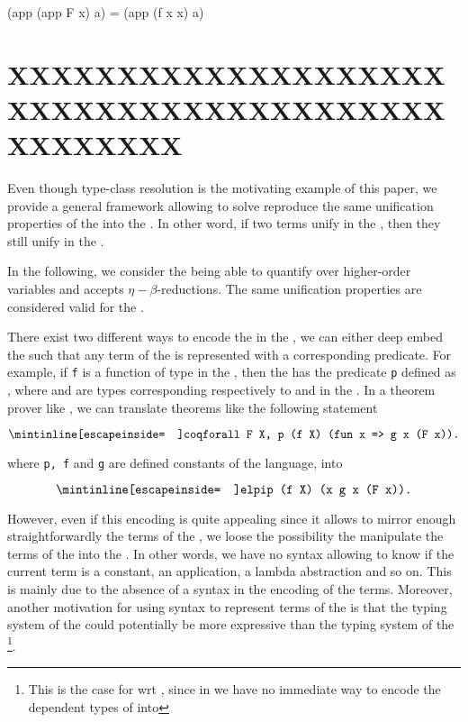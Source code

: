\documentclass{rapport}
\begin{document}
\begin{elpicode}
  (app (app F x) a) = (app (f x x) a)
\end{elpicode}




\section{XXXXXXXXXXXXXXXXXXXXXXXXXXXXXXXXXXXXXXXXXXXXXXXX}

Even though type-class resolution is the motivating example of this paper, we
provide a general framework allowing to solve reproduce the same unification
properties of the \ol into the \ml. In other word, if two terms unify in the
\ol, then they still unify in the \ml. 

In the following, we consider the \ol being able to quantify over higher-order
variables and accepts $\eta-\beta$-reductions. The same unification properties
are considered valid for the \ml.

There exist two different ways to encode the \ol in the \ml, we can either deep
embed the \ol such that any term of the \ol is represented with a corresponding
predicate. For example, if \texttt{f} is a function of type  in
the \ol, then the \ml has the predicate \texttt{p} defined as , where  and  are types corresponding
respectively to  and  in the \ol. In a theorem prover like
\coq, we can translate theorems like the following statement

\begin{equation}
  \texttt{\coqIn{forall F X, p (f X) (fun x => g x (F x)).}}
  \label{eq:coq1}
\end{equation}

where \texttt{p, f} and \texttt{g} are defined constants of the language, into

\begin{equation}
  \texttt{\elpiIn{p (f X) (x\ g x (F x)).}}
\end{equation}

\noindent However, even if this encoding is quite appealing since it allows to
mirror enough straightforwardly the terms of the \ol, we loose the possibility
the manipulate the terms of the \ol into the \ml. In other words, we have no
syntax allowing to know if the current term is a constant, an application, a
lambda abstraction and so on. This is mainly due to the absence of a syntax in
the encoding of the \ol terms. Moreover, another motivation for using syntax to
represent terms of the \ol is that  the typing system of the \ol could
potentially be more expressive than the typing system of the \ml\footnote{This
is the case for \coq wrt \elpi, since in we have no immediate way to encode
the dependent types of \coq into \elpi}.
\end{document}
